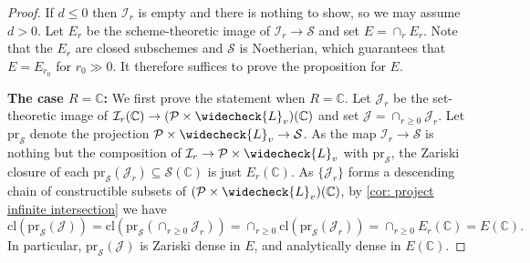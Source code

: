 \documentclass[letter, 11pt]{article}
\theoremstyle{plain}
\theoremstyle{definition}
\newcommand{\IC}{\mathbb{C}}
\newcommand{\che}[1]{\widecheck{#1}}
\newcommand{\<}{\langle}
\renewcommand{\>}{\rangle}
\newcommand{\sI}{\mathcal{I}}
\newcommand{\sJ}{\mathcal{J}}
\newcommand{\sH}{\mathcal{H}}
\newcommand{\sS}{\mathcal{S}}
\newcommand{\sP}{\mathcal{P}}
\newcommand{\pr}{\mathrm{pr}}
\newcommand{\cl}{\mathrm{cl}}
\newcommand{\mpr}{}
\begin{document}
\begin{proof}
If $d \leq 0$ then $\mathcal{I}_{r}$ is empty and there is nothing to show, so we may assume $d > 0$. \mpr{Let $E_{r}$ be the scheme-theoretic image of $\sI_{r} \to \sS$ and set $E = \cap_{r} E_{r}$. Note that the $E_{r}$ are closed subschemes and $\sS$ is Noetherian, which guarantees that $E = E_{r_0}$ for $r_0 \gg 0$. It therefore suffices to prove the proposition for $E$. }

\vspace{0.5em}

\noindent \textbf{The case $R = \IC$:} We first prove the statement when $R = \IC$. \mpr{Let $\sJ_r$ be the set-theoretic image of $\sI_r(\IC) \to (\sP \times \che{L}_{v})(\IC)$ and set $\sJ = \cap_{r \ge 0} \sJ_r$. Let $\pr_\sS$ denote the projection $\sP \times \che{L}_{v} \to \sS$. As the map $\sI_r \to \sS$ is nothing but the composition of $\sI_r \to \sP \times \che{L}_{v}$ with $\pr_\sS$, the Zariski closure of each $\pr_\sS(\sJ_r)\subseteq \sS(\IC)$ is just $E_{r}(\IC)$. As $\{ \sJ_r \}$ forms a descending chain of constructible subsets of $(\sP \times \che{L}_{v})(\IC)$, by \ref{cor: project infinite intersection} we have 
\begin{equation}
\label{eqn: prS J dense in E}
    \cl(\pr_{\sS}(\sJ)) = \cl(\pr_{\sS}(\cap_{r \ge 0} \sJ_r)) = \cap_{r \ge 0} \cl(\pr_\sS(\sJ_r)) = \cap_{r \ge 0} E_r(\IC) = E(\IC).  
\end{equation} In particular, $\pr_\sS(\sJ)$ is Zariski dense in $E$, and analytically dense in $E(\IC)$.}

\end{proof}
\end{document}
